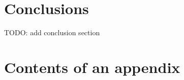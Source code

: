 \documentclass[english, 12pt, a4paper, elec, utf8, a-2b, online]{aaltothesis}
\begin{document}
\clearpage

\section{Conclusions}
\label{sec:summary}

TODO: add conclusion section


\clearpage
\thesisbibliography




\clearpage

\thesisappendix

\section{Contents of an appendix}
\label{app:contents}
\end{document}
